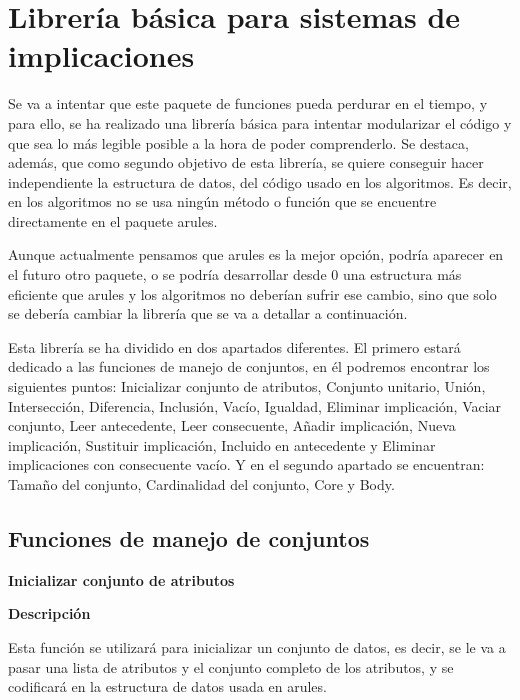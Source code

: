 \section{Librer\'ia b\'asica para sistemas de implicaciones}
Se va a intentar que este paquete de funciones pueda perdurar en el tiempo, y para ello, 
se ha realizado una librer\'ia b\'asica para intentar modularizar el c\'odigo y que sea lo 
m\'as legible posible a la hora de poder comprenderlo. Se destaca, adem\'as, que como segundo 
objetivo de esta librer\'ia, se quiere conseguir hacer independiente la estructura de datos, del c\'odigo usado 
en los algoritmos. Es decir, en los algoritmos no se usa ning\'un m\'etodo o funci\'on que se encuentre directamente 
en el paquete arules. 

Aunque actualmente pensamos que arules es la mejor opci\'on, podr\'ia aparecer en el futuro otro paquete, o se podr\'ia 
desarrollar desde 0 una estructura m\'as eficiente que arules y los algoritmos no deber\'ian sufrir ese cambio, sino que solo 
se deber\'ia cambiar la librer\'ia que se va a detallar a continuaci\'on.

Esta librer\'ia se ha dividido en dos apartados diferentes. El primero estar\'a dedicado a las funciones de manejo de conjuntos, 
en \'el podremos encontrar los siguientes puntos: Inicializar conjunto de atributos, Conjunto unitario, Unión, Intersección, 
Diferencia, Inclusi\'on, Vac\'io, Igualdad, Eliminar implicaci\'on, Vaciar conjunto, Leer antecedente, Leer consecuente, A\~nadir 
implicaci\'on, Nueva implicaci\'on, Sustituir implicaci\'on, Incluido en antecedente y Eliminar implicaciones con consecuente vac\'io. 
Y en el segundo apartado se encuentran: Tama\~no del conjunto, Cardinalidad del conjunto, Core y Body.

\subsection{Funciones de manejo de conjuntos}

\smallskip

\textbf{ \large Inicializar conjunto de atributos}

    \smallskip

    \textbf{Descripci\'on}

    Esta funci\'on se utilizar\'a para inicializar un conjunto de datos, es decir, se le va a pasar una lista de atributos y el 
    conjunto completo de los atributos, y se codificar\'a en la estructura de datos usada en arules.
    
